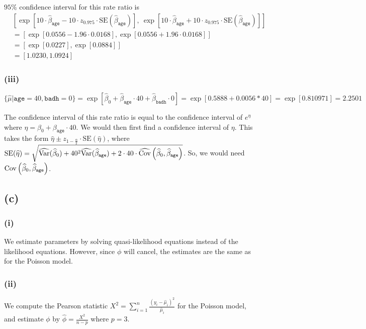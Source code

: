 $95\%$ confidence interval for this rate ratio is
\begin{align*}
&\left[\exp\left[10\cdot\widehat{\beta}_{\mathrm{\texttt{age}}} - 10\cdot z_{0.975} \cdot \mathrm{SE}(\widehat{\beta}_{\mathrm{\texttt{age}}})\right],~\exp\left[10\cdot\widehat{\beta}_{\mathrm{\texttt{age}}} + 10\cdot z_{0.975} \cdot \mathrm{SE}(\widehat{\beta}_{\mathrm{\texttt{age}}})\right] \right]\\
&= [\exp[0.0556 - 1.96 \cdot 0.0168], \exp[0.0556 + 1.96 \cdot 0.0168]]\\
&= \left[\exp[0.0227], \exp[0.0884]\right]\\
&= [1.0230, 1.0924]
\end{align*}

\subsubsection*{(iii)}
$\{\widehat{\mu}|\texttt{age} = 40, \texttt{badh} = 0\} = \exp\left[\widehat{\beta}_{0} + \widehat{\beta}_{\texttt{age}}\cdot40 + \widehat{\beta}_{\texttt{badh}}\cdot0\right] = \exp\left[0.5888 + 0.0056*40\right] = \exp\left[0.810971\right] = 2.2501$

The confidence interval of this rate ratio is equal to the confidence interval of $e^{\eta}$ where $\eta = \beta_{0} + \beta_{\texttt{age}}\cdot40$. We would then first find a confidence interval of $\eta$. This takes the form $\widehat{\eta} \pm z_{1-\frac{\alpha}{2}}\cdot \mathrm{SE}(\widehat{\eta})$, where $\mathrm{SE}(\widehat{\eta}) = \sqrt{\widehat{\mathrm{Var}}(\widehat{\beta}_{0}) + 40^{2}\widehat{\mathrm{Var}}(\widehat{\beta}_{\texttt{age}}) + 2\cdot40\cdot \widehat{\mathrm{Cov}}\left(\widehat{\beta}_{0}, \widehat{\beta}_{\texttt{age}}\right)}$. So, we would need $\mathrm{Cov}\left(\widehat{\beta}_{0}, \widehat{\beta}_{\texttt{age}}\right)$.


\vspace{\baselineskip}
\subsection*{(c)}

\subsubsection*{(i)}
We estimate parameters by solving quasi-likelihood equations instead of the likelihood equations. However, since $\phi$ will cancel, the estimates are the same as for the Poisson model.

\subsubsection*{(ii)}
We compute the Pearson statistic $X^{2} = \sum_{i=1}^{n} \frac{(y_{i} - \widehat{\mu}_{i})^{2}}{\widehat{\mu}_{i}}$ for the Poisson model, and estimate $\phi$ by $\widehat{\phi} = \frac{X^{2}}{n-p}$ where $p = 3$.

